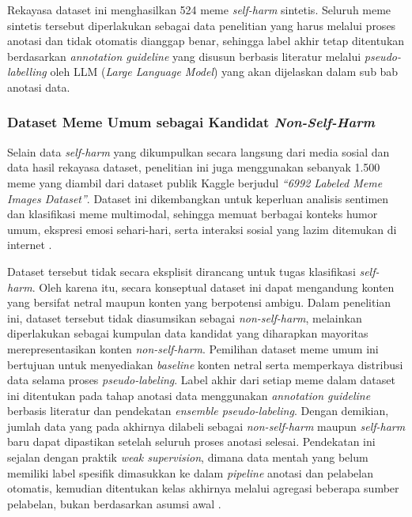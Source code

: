 Rekayasa dataset ini menghasilkan 524 meme \textit{self-harm} sintetis. Seluruh meme sintetis tersebut diperlakukan sebagai data penelitian yang harus melalui proses anotasi dan tidak otomatis dianggap benar, sehingga label akhir tetap ditentukan berdasarkan \textit{annotation guideline} yang disusun berbasis literatur melalui \textit{pseudo-labelling} oleh LLM (\textit{Large Language Model}) yang akan dijelaskan dalam sub bab anotasi data.

\subsubsection{Dataset Meme Umum sebagai Kandidat \textit{Non-Self-Harm}} \label{subsubsec:dataset_meme_umum_non_self_harm}
Selain data \textit{self-harm} yang dikumpulkan secara langsung dari media sosial dan data hasil rekayasa dataset, penelitian ini juga menggunakan sebanyak 1.500 meme yang diambil dari dataset publik Kaggle berjudul \textit{``6992 Labeled Meme Images Dataset''}. Dataset ini dikembangkan untuk keperluan analisis sentimen dan klasifikasi meme multimodal, sehingga memuat berbagai konteks humor umum, ekspresi emosi sehari-hari, serta interaksi sosial yang lazim ditemukan di internet \cite{javaid_6992_meme_images_2023}.

Dataset tersebut tidak secara eksplisit dirancang untuk tugas klasifikasi \textit{self-harm}. Oleh karena itu, secara konseptual dataset ini dapat mengandung konten yang bersifat netral maupun konten yang berpotensi ambigu. Dalam penelitian ini, dataset tersebut tidak diasumsikan sebagai \textit{non-self-harm}, melainkan diperlakukan sebagai kumpulan data kandidat yang diharapkan mayoritas merepresentasikan konten \textit{non-self-harm}. Pemilihan dataset meme umum ini bertujuan untuk menyediakan \textit{baseline} konten netral serta memperkaya distribusi data selama proses \textit{pseudo-labeling}. Label akhir dari setiap meme dalam dataset ini ditentukan pada tahap anotasi data menggunakan \textit{annotation guideline} berbasis literatur dan pendekatan \textit{ensemble pseudo-labeling}. Dengan demikian, jumlah data yang pada akhirnya dilabeli sebagai \textit{non-self-harm} maupun \textit{self-harm} baru dapat dipastikan setelah seluruh proses anotasi selesai. Pendekatan ini sejalan dengan praktik \textit{weak supervision}, dimana data mentah yang belum memiliki label spesifik dimasukkan ke dalam \textit{pipeline} anotasi dan pelabelan otomatis, kemudian ditentukan kelas akhirnya melalui agregasi beberapa sumber pelabelan, bukan berdasarkan asumsi awal \cite{ratner2019}.


